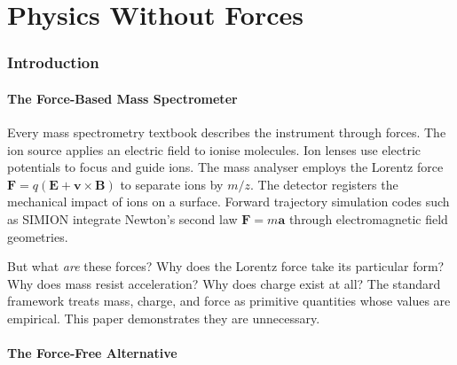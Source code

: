 \documentclass[11pt,twocolumn,a4paper]{article}
\theoremstyle{definition}
\theoremstyle{remark}
\begin{document}
\begin{abstract}
\medskip
\noindent\textbf{Keywords:} force-free mass spectrometry, partition depth minimisation, GPU fragment shaders, categorical state propagation, partition Lagrangian, partition creation, partition completion, phase-locked networks, partition lag, six-pass architecture
\end{abstract}



\part{Physics Without Forces}

\section{Introduction}
\label{sec:introduction}

\subsection{The Force-Based Mass Spectrometer}

Every mass spectrometry textbook \citep{gross2017, march2005} describes the instrument through forces. The ion source applies an electric field to ionise molecules. Ion lenses use electric potentials to focus and guide ions. The mass analyser employs the Lorentz force $\mathbf{F} = q(\mathbf{E} + \mathbf{v} \times \mathbf{B})$ to separate ions by $m/z$. The detector registers the mechanical impact of ions on a surface. Forward trajectory simulation codes such as SIMION \citep{dahl2000simion} integrate Newton's second law $\mathbf{F} = m\mathbf{a}$ through electromagnetic field geometries.

But what \emph{are} these forces? Why does the Lorentz force take its particular form? Why does mass resist acceleration? Why does charge exist at all? The standard framework treats mass, charge, and force as primitive quantities whose values are empirical. This paper demonstrates they are unnecessary.

\subsection{The Force-Free Alternative}
\end{document}

